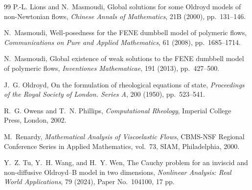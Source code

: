 \documentclass[11pt]{article}
\begin{document}
\begin{thebibliography}{99}
P.-L. Lions and N.~Masmoudi,
\newblock Global solutions for some Oldroyd models of non-Newtonian flows,
\newblock \emph{Chinese Annals of Mathematics}, 21B (2000), pp.~131--146.

N.~Masmoudi,
\newblock Well-posedness for the FENE dumbbell model of polymeric flows,
\newblock \emph{Communications on Pure and Applied Mathematics}, 61 (2008),
pp.~1685--1714.

N.~Masmoudi,
\newblock Global existence of weak solutions to the FENE dumbbell model of
polymeric flows,
\newblock \emph{Inventiones Mathematicae}, 191 (2013), pp.~427--500.

J.~G. Oldroyd,
\newblock On the formulation of rheological equations of state,
\newblock \emph{Proceedings of the Royal Society of London. Series A}, 200
(1950), pp.~523--541.

R.~G. Owens and T.~N. Phillips,
\newblock \emph{Computational Rheology},
\newblock Imperial College Press, London, 2002.

M.~Renardy,
\newblock \emph{Mathematical Analysis of Viscoelastic Flows},
\newblock CBMS-NSF Regional Conference Series in Applied Mathematics, vol.~73,
SIAM, Philadelphia, 2000.

Y.~Z. Tu, Y.~H. Wang, and H.~Y. Wen,
\newblock The Cauchy problem for an inviscid and non-diffusive Oldroyd--B model
in two dimensions,
\newblock \emph{Nonlinear Analysis: Real World Applications}, 79 (2024),
Paper No.~104100, 17 pp.

\end{thebibliography}
\end{document}
